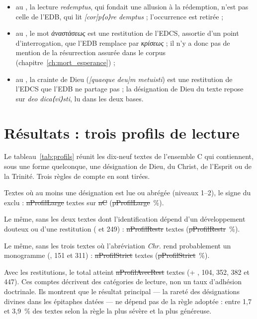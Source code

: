 \begin{itemize}
\item au , la lecture \emph{redemptus}, qui fondait une allusion à la rédemption, n’est pas celle de l’EDB, qui lit \emph{[cor]p⟨o⟩re demptus} ; l’occurrence est retirée ;
\item au , le mot \emph{ἀναστάσεως} est une restitution de l’EDCS, assortie d’un point d’interrogation, que l’EDB remplace par \emph{κρίσεως} ; il n’y a donc pas de mention de la résurrection assurée dans le corpus (chapitre~\ref{ch:mort_esperance}) ;
\item au , la crainte de Dieu (\emph{[quaeque deu]m metuisti}) est une restitution de l’EDCS que l’EDB ne partage pas ; la désignation de Dieu du texte repose sur \emph{deo dica⟨vi⟩sti}, lu dans les deux bases.
\end{itemize}

\section{Résultats : trois profils de lecture}

Le tableau~\ref{tab:profils} réunit les dix-neuf textes de l’ensemble C qui contiennent, sous une forme quelconque, une désignation de Dieu, du Christ, de l’Esprit ou de la Trinité. Trois règles de compte en sont tirées.

\begin{description}[style=nextline,leftmargin=1.5em,font=\normalfont\scshape]
\item[Profil large] Textes où au moins une désignation est lue ou abrégée (niveaux 1–2), le signe du  exclu : \st{nProfilLarge} textes sur \st{nC} (\st{pProfilLarge}~\%).
\item[Profil restrictif] Le même, sans les deux textes dont l’identification dépend d’un développement douteux ou d’une restitution ( et 249) : \st{nProfilRestr} textes (\st{pProfilRestr}~\%).
\item[Profil strict] Le même, sans les trois textes où l’abréviation \emph{Chr.} rend probablement un monogramme (, 151 et 311) : \st{nProfilStrict} textes (\st{pProfilStrict}~\%).
\end{description}

Avec les restitutions, le total atteint \st{nProfilAvecRest} textes (+ , 104, 352, 382 et 447). Ces comptes décrivent des catégories de lecture, non un taux d’adhésion doctrinale. Ils montrent que le résultat principal — la rareté des désignations divines dans les épitaphes datées — ne dépend pas de la règle adoptée : entre 1,7 et 3,9~\% des textes selon la règle la plus sévère et la plus généreuse.

